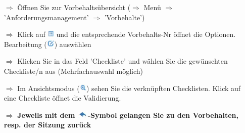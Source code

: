\documentclass{article}
\begin{document}
\begin{tcolorbox}[colback=blue!5,colframe=blue!40!black,title=Allgemeines zu Workflows]
\begin{itemize}
  \item[$\Longrightarrow$] Öffnen Sie zur Vorbehaltsübersicht ($\Rightarrow$ Menü $\Rightarrow$ 'Anforderungsmanagement' $\Rightarrow$ 'Vorbehalte')
  \item[$\Longrightarrow$] Klick auf \includegraphics[height=10pt]{Icons/Listensymbol.jpg} und die entsprechende Vorbehalts-Nr öffnet die Optionen. Bearbeitung (\includegraphics[height=10pt]{Icons/Bearbeiten.jpg}) auswählen
  \item[$\Longrightarrow$] Klicken Sie in das Feld 'Checkliste' und wählen Sie die gewünschten Checkliste/n aus (Mehrfachauswahl möglich)
  \item[$\Longrightarrow$] Im Ansichtsmodus (\includegraphics[height=10pt]{Icons/Lupe.jpg})	sehen Sie die verknüpften Checklisten. Klick auf eine Checkliste öffnet die Validierung.
\vspace{\baselineskip}
  \item[$\Longrightarrow$] \textbf{Jeweils mit dem \includegraphics[height=10pt]{Icons/Pfeil_l.jpg}-Symbol gelangen Sie zu den Vorbehalten, resp. der Sitzung zurück}
\end{itemize}
\end{tcolorbox}

\end{document}

